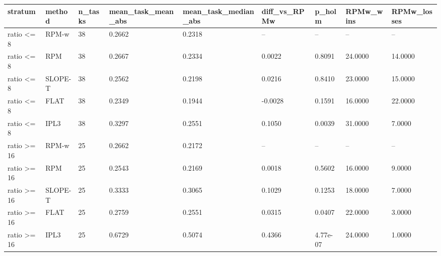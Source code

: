 \begin{tabular}{lllllllll}
\hline
stratum & method & n\_tasks & mean\_task\_mean\_abs & mean\_task\_median\_abs & diff\_vs\_RPMw & p\_holm & RPMw\_wins & RPMw\_losses \\
\hline
ratio <= 8 & RPM-w & 38 & 0.2662 & 0.2318 & – & – & – & – \\
ratio <= 8 & RPM & 38 & 0.2667 & 0.2334 & 0.0022 & 0.8091 & 24.0000 & 14.0000 \\
ratio <= 8 & SLOPE-T & 38 & 0.2562 & 0.2198 & 0.0216 & 0.8410 & 23.0000 & 15.0000 \\
ratio <= 8 & FLAT & 38 & 0.2349 & 0.1944 & -0.0028 & 0.1591 & 16.0000 & 22.0000 \\
ratio <= 8 & IPL3 & 38 & 0.3297 & 0.2551 & 0.1050 & 0.0039 & 31.0000 & 7.0000 \\
ratio >= 16 & RPM-w & 25 & 0.2662 & 0.2172 & – & – & – & – \\
ratio >= 16 & RPM & 25 & 0.2543 & 0.2169 & 0.0018 & 0.5602 & 16.0000 & 9.0000 \\
ratio >= 16 & SLOPE-T & 25 & 0.3333 & 0.3065 & 0.1029 & 0.1253 & 18.0000 & 7.0000 \\
ratio >= 16 & FLAT & 25 & 0.2759 & 0.2551 & 0.0315 & 0.0407 & 22.0000 & 3.0000 \\
ratio >= 16 & IPL3 & 25 & 0.6729 & 0.5074 & 0.4366 & 4.77e-07 & 24.0000 & 1.0000 \\
\hline
\end{tabular}
